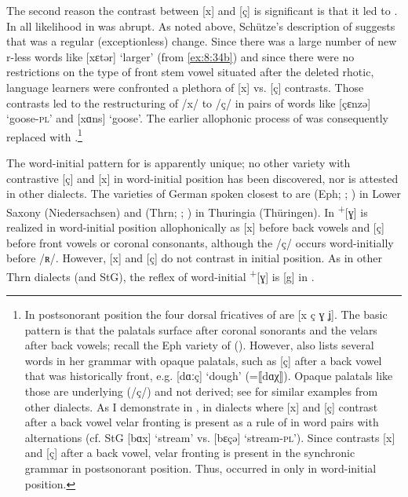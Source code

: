 The second reason the contrast between [x] and [ç] is significant is that it led to . In all likelihood  in  was abrupt. As noted above, Schütze’s description of  suggests that  was a regular (exceptionless) change. Since there was a large number of new r-less words like [xɛtər] ‘larger’ (from \ref{ex:8:34b}) and since there were no restrictions on the type of front stem vowel situated after the deleted rhotic, language learners were confronted a plethora of [x] vs. [ç] contrasts. Those contrasts led to the restructuring of /x/ to /ç/ in pairs of words like [çɛnzə] ‘goose-\textsc{pl}’ and [xɑns]  ‘goose’. The earlier allophonic process of  was consequently replaced with .\footnote{{In postsonorant position the four dorsal fricatives of  are [x ç ɣ ʝ]. The basic pattern is that the palatals surface after coronal sonorants and the velars after back vowels; recall the Eph variety of  (). However, \citet{Schütze1953} also lists several words in her grammar with opaque palatals, such as [ç] after a back vowel that was historically front, e.g. [dɑːç] ‘dough’ (=⟦dɑχ⟧). Opaque palatals like those are underlying (/ç/) and not derived; see  for similar examples from other dialects. As I demonstrate in , in dialects where [x] and [ç] contrast after a back vowel velar fronting is present as a rule of  in word pairs with  alternations (cf. StG [bɑx] ‘stream’ vs. [bɛçə] ‘stream-\textsc{pl}’). Since  contrasts [x] and [ç] after a back vowel, velar fronting is present in the synchronic grammar in postsonorant position. Thus,  occurred in  only in word-initial position.}}

The word-initial pattern for  is apparently unique; no other variety with contrastive [ç] and [x] in word-initial position has been discovered, nor is  attested in other dialects. The varieties of German spoken closest to  are  (Eph; \citealt{Jungandreas1926,Jungandreas1927}; ) in Lower Saxony (Niedersachsen) and  (Thrn; \citealt{Hentrich1905}; ) in Thuringia (Thüringen). In   \textsuperscript{+}[ɣ] is realized in word-initial position allophonically as [x] before back vowels and [ç] before front vowels or coronal consonants, although the  /ç/ occurs word-initially before /ʀ/. However, [x] and [ç] do not contrast in initial position. As in other Thrn dialects (and StG), the reflex of word-initial   \textsuperscript{+}[ɣ] is [g] in .

